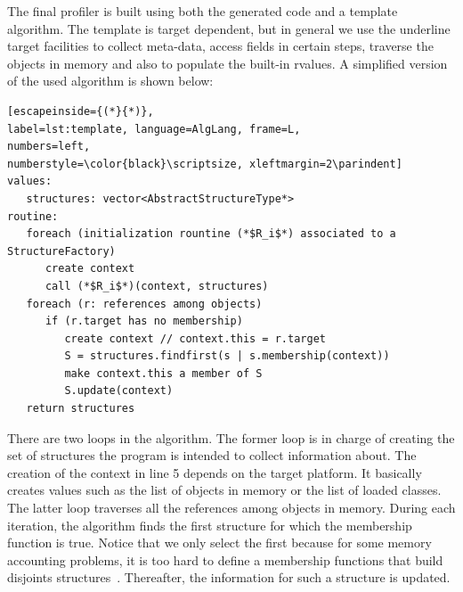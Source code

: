 The final profiler is built using both the generated code and a template algorithm.
The template is target dependent, but in general we use the underline target facilities to collect meta-data, access fields in certain steps, traverse the objects in memory and also to populate the built-in rvalues.
A simplified version of the used algorithm is shown below:
\begin{lstlisting}[escapeinside={(*}{*)},
label=lst:template, language=AlgLang, frame=L,
numbers=left,
numberstyle=\color{black}\scriptsize, xleftmargin=2\parindent]
values:
   structures: vector<AbstractStructureType*>
routine:
   foreach (initialization rountine (*$R_i$*) associated to a StructureFactory)
      create context
	  call (*$R_i$*)(context, structures)
   foreach (r: references among objects)
      if (r.target has no membership)
         create context // context.this = r.target
         S = structures.findfirst(s | s.membership(context))
         make context.this a member of S
         S.update(context)
   return structures 
\end{lstlisting}
There are two loops in the algorithm. 
The former loop is in charge of creating the set of structures the program is intended to collect information about.
The creation of the context in line 5 depends on the target platform.
It basically creates values such as the list of objects in memory or the list of loaded classes.
The latter loop traverses all the references among objects in memory.
During each iteration, the algorithm finds the first structure for which the membership function is true.
Notice that we only select the first because for some memory accounting problems, it is too hard to define a membership functions that build disjoints structures~\cite{dsn/09/geoffray/ijvm,Attouchi:2014:MMM:2602458.2602467}.
Thereafter, the information for such a structure is updated.


